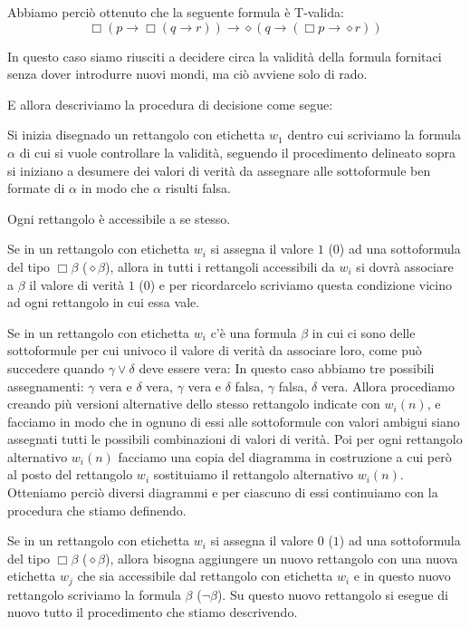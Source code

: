 \documentclass[a4paper, titlepage, 12pt]{report}
\begin{document}
Abbiamo perciò ottenuto che la seguente formula è T-valida:
$$\Box(p \rightarrow \Box(q \rightarrow r)) \rightarrow \diamond(q \rightarrow (\Box p \rightarrow \diamond r))$$

In questo caso siamo riusciti a decidere circa la validità della formula fornitaci
senza dover introdurre nuovi mondi, ma ciò avviene solo di rado.

E allora descriviamo la procedura di decisione come segue:

Si inizia disegnado un rettangolo  con etichetta $w_1$ dentro cui scriviamo la formula $\alpha$
di cui si vuole controllare la validità, seguendo il procedimento delineato sopra
si iniziano a desumere dei valori di verità da assegnare alle sottoformule ben formate di $\alpha$
in modo che $\alpha$ risulti falsa.

Ogni rettangolo è accessibile a se stesso.

Se in un rettangolo con etichetta $w_i$ si assegna il valore $1$ ($0$) ad una sottoformula
del tipo $\Box \beta$ ($\diamond \beta$), allora in tutti i rettangoli accessibili da $w_i$ si dovrà
associare a $\beta$ il valore di verità $1$ ($0$) e per ricordarcelo scriviamo questa condizione
vicino ad ogni rettangolo in cui essa vale.

Se in un rettangolo con etichetta $w_i$ c'è una formula $\beta$
in cui ci sono delle sottoformule per cui univoco il valore di verità da associare loro,
come può succedere quando $\gamma \lor \delta$ deve essere vera: In questo caso abbiamo
tre possibili assegnamenti:
$\gamma$ vera e $\delta$ vera, $\gamma$ vera e $\delta$ falsa, $\gamma$ falsa, $\delta$ vera.
Allora procediamo creando più versioni alternative dello stesso rettangolo indicate con $w_i(n)$,
e facciamo in modo che in ognuno di essi alle sottoformule con valori ambigui siano assegnati
tutti le possibili combinazioni di valori di verità.
Poi per ogni rettangolo alternativo $w_i(n)$ facciamo una copia del diagramma in costruzione
a cui però al posto del rettangolo $w_i$ sostituiamo il
rettangolo alternativo $w_i(n)$. Otteniamo perciò diversi diagrammi
e per ciascuno di essi continuiamo con la procedura che stiamo definendo.

Se in un rettangolo con etichetta $w_i$ si assegna il valore $0$ ($1$) ad una sottoformula
del tipo $\Box \beta$ ($\diamond \beta$), allora bisogna aggiungere un nuovo
rettangolo con una nuova etichetta $w_j$ che sia accessibile dal rettangolo con etichetta $w_i$
e in questo nuovo rettangolo scriviamo la formula $\beta$ ($\neg \beta$).
Su questo nuovo rettangolo si esegue di nuovo tutto il procedimento che stiamo descrivendo.
\end{document}
